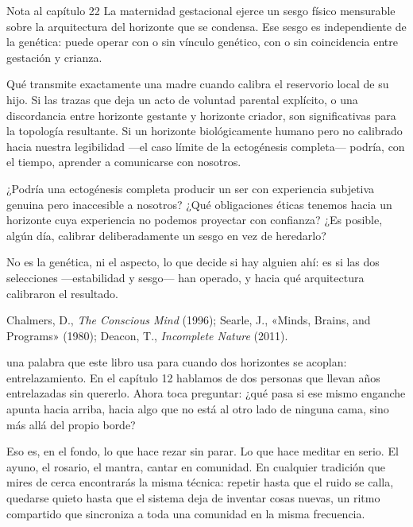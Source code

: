 \begin{notacap}{Nota al capítulo 22}
 La maternidad gestacional ejerce un sesgo físico mensurable sobre la arquitectura del horizonte que se condensa. Ese sesgo es independiente de la genética: puede operar con o sin vínculo genético, con o sin coincidencia entre gestación y crianza.

 Qué transmite exactamente una madre cuando calibra el reservorio local de su hijo. Si las trazas que deja un acto de voluntad parental explícito, o una discordancia entre horizonte gestante y horizonte criador, son significativas para la topología resultante. Si un horizonte biológicamente humano pero no calibrado hacia nuestra legibilidad —el caso límite de la ectogénesis completa— podría, con el tiempo, aprender a comunicarse con nosotros.

 ¿Podría una ectogénesis completa producir un ser con experiencia subjetiva genuina pero inaccesible a nosotros? ¿Qué obligaciones éticas tenemos hacia un horizonte cuya experiencia no podemos proyectar con confianza? ¿Es posible, algún día, calibrar deliberadamente un sesgo en vez de heredarlo?

 No es la genética, ni el aspecto, lo que decide si hay alguien ahí: es si las dos selecciones —estabilidad y sesgo— han operado, y hacia qué arquitectura calibraron el resultado.

 Chalmers, D., \emph{The Conscious Mind} (1996); Searle, J., «Minds, Brains, and Programs» (1980); Deacon, T., \emph{Incomplete Nature} (2011).
\end{notacap}
\noindent {} una palabra que este libro usa para cuando dos horizontes se acoplan: entrelazamiento. En el capítulo 12 hablamos de dos personas que llevan años entrelazadas sin quererlo. Ahora toca preguntar: ¿qué pasa si ese mismo enganche apunta hacia arriba, hacia algo que no está al otro lado de ninguna cama, sino más allá del propio borde?

Eso es, en el fondo, lo que hace rezar sin parar. Lo que hace meditar en serio. El ayuno, el rosario, el mantra, cantar en comunidad. En cualquier tradición que mires de cerca encontrarás la misma técnica: repetir hasta que el ruido se calla, quedarse quieto hasta que el sistema deja de inventar cosas nuevas, un ritmo compartido que sincroniza a toda una comunidad en la misma frecuencia.


